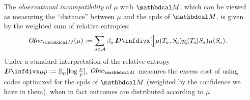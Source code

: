 \documentclass[twoside]{article}
\begin{document}
The \emph{observational incompatibility} of $\mu$ with $\dg M$, which
can be viewed as measuring the ``distance''  between $\mu$ and the cpds of $\dg M$,
is given by the weighted sum of relative entropies:
\begin{align*}
    \OInc_{\dg M}(\mu) :=
        \sum_{a \in \Ar} \beta_a\, \kldiv[\Big]{\mu(\Tgt a,\Src a)}{p\ssub a(\Tgt a | \Src a) \mu(\Src a)}.
\end{align*}
Under a standard interpretation of the relative entropy $\kldiv{\mu}{p} := \Ex_{\mu}[\log \frac\mu p]$,
$\OInc_{\dg M}$ measures the excess cost of using codes optimized for the cpds of $\dg M$ (weighted by the confidence we have in them), when in fact outcomes are distributed according to $\mu$.
\end{document}
